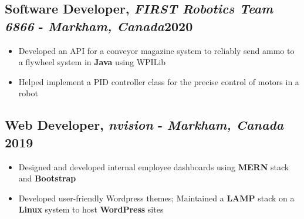\documentclass[9pt]{article}
\begin{document}
\subsection{Software Developer, \textit{FIRST Robotics Team 6866} - \normalsize\textit{Markham, Canada}\hfill \normalsize\textnormal{2020}}
\begin{itemize}
  \item Developed an API for a conveyor magazine system to reliably send ammo to a flywheel system in \textbf{Java} using WPILib
  \item Helped implement a PID controller class for the precise control of motors in a robot
\end{itemize}

\subsection{Web Developer, \textit{nvision} - \normalsize\textit{Markham, Canada} \hfill \normalsize\textnormal{2019}}
\begin{itemize}
  \item Designed and developed internal employee dashboards using \textbf{MERN} stack and \textbf{Bootstrap} 
  \item Developed user-friendly Wordpress themes; Maintained a \textbf{LAMP} stack on a \textbf{Linux} system to host \textbf{WordPress} sites
\end{itemize}


\end{document}
